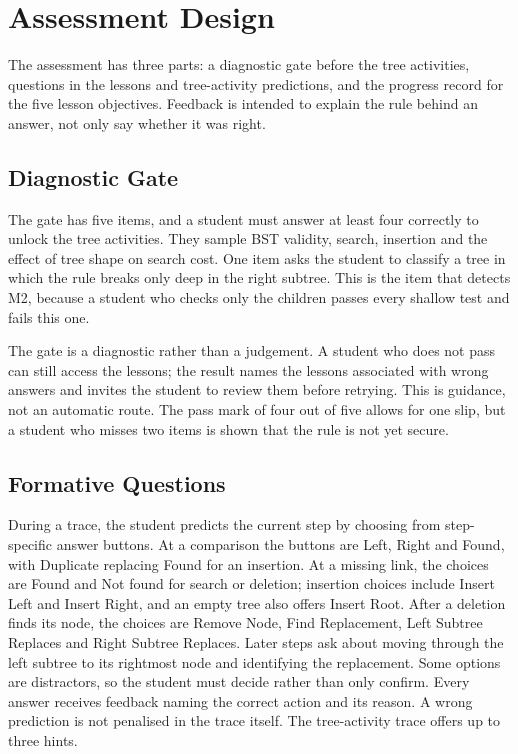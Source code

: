 \section{Assessment Design}\label{sec:id-assessment}

The assessment has three parts: a diagnostic gate before the tree activities, questions in the lessons and tree-activity predictions, and the progress record for the five lesson objectives. Feedback is intended to explain the rule behind an answer, not only say whether it was right.

\subsection{Diagnostic Gate}
The gate has five items, and a student must answer at least four correctly to unlock the tree activities. They sample BST validity, search, insertion and the effect of tree shape on search cost. One item asks the student to classify a tree in which the rule breaks only deep in the right subtree. This is the item that detects M2, because a student who checks only the children passes every shallow test and fails this one.

The gate is a diagnostic rather than a judgement. A student who does not pass can still access the lessons; the result names the lessons associated with wrong answers and invites the student to review them before retrying. This is guidance, not an automatic route. The pass mark of four out of five allows for one slip, but a student who misses two items is shown that the rule is not yet secure.

\subsection{Formative Questions}
During a trace, the student predicts the current step by choosing from step-specific answer buttons. At a comparison the buttons are Left, Right and Found, with Duplicate replacing Found for an insertion. At a missing link, the choices are Found and Not found for search or deletion; insertion choices include Insert Left and Insert Right, and an empty tree also offers Insert Root. After a deletion finds its node, the choices are Remove Node, Find Replacement, Left Subtree Replaces and Right Subtree Replaces. Later steps ask about moving through the left subtree to its rightmost node and identifying the replacement. Some options are distractors, so the student must decide rather than only confirm. Every answer receives feedback naming the correct action and its reason. A wrong prediction is not penalised in the trace itself. The tree-activity trace offers up to three hints.

